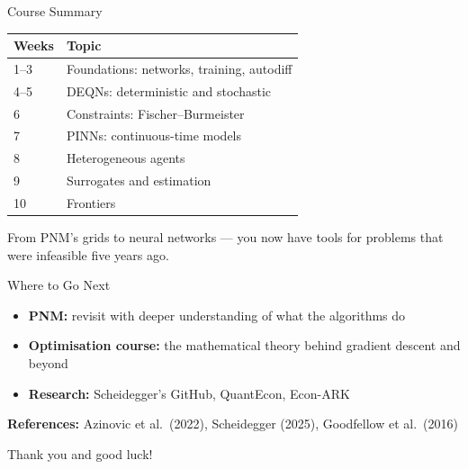 \documentclass[aspectratio=169, 10pt]{beamer}
\begin{document}
\begin{frame}{Course Summary}
\begin{center}
\begin{tabular}{ll}
\toprule
Weeks & Topic \\
\midrule
1--3 & Foundations: networks, training, autodiff \\
4--5 & DEQNs: deterministic and stochastic \\
6 & Constraints: Fischer--Burmeister \\
7 & PINNs: continuous-time models \\
8 & Heterogeneous agents \\
9 & Surrogates and estimation \\
10 & Frontiers \\
\bottomrule
\end{tabular}
\end{center}

\bigskip
From PNM's grids to neural networks --- you now have tools for problems that were infeasible five years ago.
\end{frame}

\begin{frame}{Where to Go Next}
\begin{itemize}
\item \textbf{PNM:} revisit with deeper understanding of what the algorithms do
\item \textbf{Optimisation course:} the mathematical theory behind gradient descent and beyond
\item \textbf{Research:} Scheidegger's GitHub, QuantEcon, Econ-ARK
\end{itemize}

\bigskip
\textbf{References:} Azinovic et al.\ (2022), Scheidegger (2025), Goodfellow et al.\ (2016)

\par\bigskip
\alert{Thank you and good luck!}
\end{frame}
\end{document}
